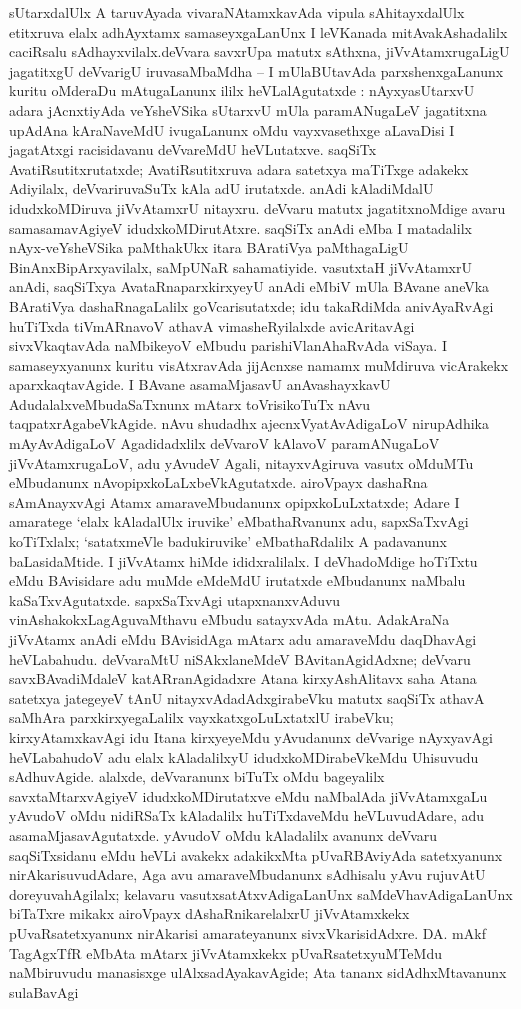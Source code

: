 sUtarxdalUlx A taruvAyada vivaraNAtamxkavAda vipula sAhitayxdalUlx etitx\-ruva elalx adhAyxtamx samaseyxgaLanUnx I leVKanada mitAvakAshadalilx caciRsalu sAdhayxvilalx.\break deVvara savxrUpa matutx sAthxna, jiVvAtamxrugaLigU jagatitxgU deVvarigU iruva\break saMbaMdha -- I mUlaBUtavAda parxshenxgaLanunx kuritu oMderaDu mAtugaLanunx ililx heVLalAgutatxde : nAyxyasUtarxvU adara jAcnxtiyAda veYsheVSika sUtarxvU mUla para\-mANugaLeV jagatitxna upAdAna kAraNaveMdU ivugaLanunx oMdu vayxvasethxge aLavaDisi I jagatAtxgi racisidavanu deVvareMdU heVLutatxve. saqSiTx AvatiR\-su\-titxrutatxde; AvatiRsu\-titxruva adara satetxya maTiTxge adakekx Adiyilalx, deVvariruvaSuTx kAla adU iru\-tatxde. anAdi kAladiMdalU idudxkoMDiruva jiVvAtamxrU nitayxru. deVvaru matutx jagatitx\-noMdige avaru samasamavAgiyeV idudxkoMDirutAtxre. saqSiTx anAdi eMba I matadalilx nAyx-veYsheVSika paMthakUkx itara BAratiVya paMthagaLigU BinAnxBipArxya\-vilalx, saMpUNaR sahamatiyide. vasutxtaH jiVvAtamxrU anAdi, saqSiTxya AvataRna\break parxkirxyeyU anAdi eMbiV mUla BAvane aneVka BAratiVya dashaRnagaLalilx goVcari\-sutatxde; idu takaRdiMda anivAyaRvAgi huTiTxda tiVmARnavoV athavA vimasheR\-yilalxde avicAritavAgi sivxVkaqtavAda naMbikeyoV eMbudu parishiVlanAhaRvAda viSaya. I samaseyxyanunx kuritu visAtxravAda jijAcnxse namamx muMdiruva vicArakekx aparxkaqtavAgide. I BAvane asamaMjasavU anAvashayxkavU AdudalalxveMbudaSaTxnunx mAtarx toVrisikoTuTx nAvu taqpatxrAgabeVkAgide. nAvu shudadhx ajecnxVyatAvAdigaLoV nirupAdhika mAyAvAdigaLoV  Agadidadxlilx deVvaroV kAlavoV paramANugaLoV jiVvAtamxrugaLoV, adu yAvudeV Agali, nitayxvAgiruva vasutx oMduMTu eMbudanunx nAvopipxkoLaLxbeVkAgutatxde. airoVpayx dashaRna sAmAnayxvAgi Atamx amaraveMbudanunx opipxkoLuLxtatxde; Adare I amaratege `elalx kAladalUlx iruvike' eMbathaRvanunx adu, sapxSaTxvAgi koTiTxlalx; `satatxmeVle badukiruvike' eMbathaRdalilx A padavanunx baLasidaMtide. I jiVvAtamx hiMde ididxralilalx. I deVhadoMdige hoTiTxtu eMdu BAvisidare adu muMde eMdeMdU irutatxde eMbudanunx naMbalu kaSaTxvAgutatxde. sapxSaTxvAgi utapxnanxvAduvu vinAshakokxLagAguvaMthavu eMbudu satayxvAda mAtu. AdakAraNa jiVvAtamx anAdi eMdu BAvisidAga mAtarx adu amaraveMdu daqDhavAgi heVLabahudu. deVvaraMtU niSAkxlaneMdeV BAvitanAgidAdxne; deVvaru savxBAvadiMdaleV katARranAgidadxre Atana kirxyAshAlitavx saha Atana satetxya jategeyeV tAnU nitayxvAdadAdxgirabeVku matutx saqSiTx athavA saMhAra parxkirxyegaLalilx vayxkatxgoLuLxtatxlU irabeVku; kirxyAtamxkavAgi idu Itana kirxyeyeMdu yAvudanunx deVvarige nAyxyavAgi heVLabahudoV adu elalx kAladalilxyU idudxkoMDirabeVkeMdu Uhisuvudu sAdhuvAgide. alalxde, deVvaranunx biTuTx oMdu bageyalilx savxtaMtarxvAgiyeV idudxkoMDirutatxve eMdu naMbalAda jiVvAtamxgaLu yAvudoV oMdu nidiRSaTx kAladalilx huTiTxdaveMdu heVLuvudAdare, adu asamaMjasavAgutatxde. yAvudoV oMdu kAladalilx avanunx deVvaru saqSiTxsidanu eMdu heVLi avakekx adakikxMta pUvaRBAviyAda satetxyanunx nirAkarisuvudAdare, Aga avu amaraveMbudanunx sAdhisalu yAvu rujuvAtU doreyuvahAgilalx; kelavaru vasutxsatAtxvAdigaLanUnx saMdeVhavAdigaLanUnx biTaTxre mikakx airoVpayx dAshaRnikarelalxrU jiVvAtamxkekx pUvaRsatetxyanunx nirAkarisi amarateyanunx sivxVkarisidAdxre. DA. mAkf TagAgxTfR eMbAta mAtarx jiVvAtamxkekx pUvaRsatetxyuMTeMdu naMbiruvudu manasisxge ulAlxsadAyakavAgide; Ata tananx sidAdhxMtavanunx sulaBavAgi 